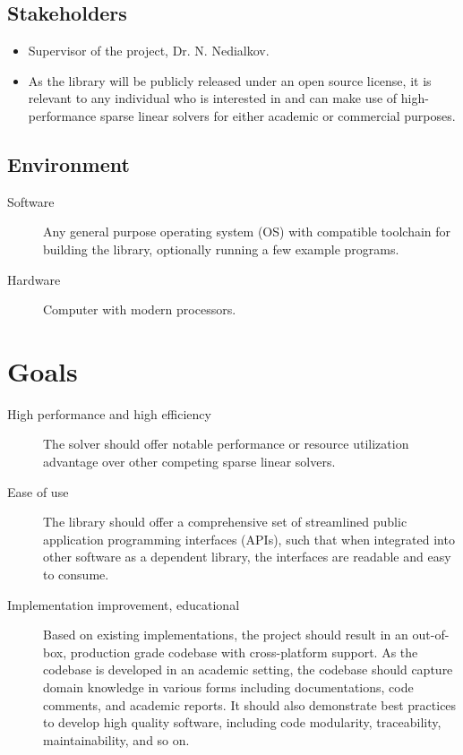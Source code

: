 \documentclass{article}
\begin{document}
\subsection{Stakeholders}

\begin{itemize}
\item Supervisor of the project, Dr. N. Nedialkov.
\item As the library will be publicly released under an open source license, it is
  relevant to any individual who is interested in and can make use of
  high-performance sparse linear solvers for either academic or commercial
  purposes.
\end{itemize}

\subsection{Environment}


\begin{description}
\item[Software] Any general purpose operating system (OS) with compatible toolchain
  for building the library, optionally running a few example programs.
\item[Hardware] Computer with modern processors.
\end{description}

\section{Goals}

\begin{description}
\item[High performance and high efficiency] The solver should offer notable
  performance or resource utilization advantage over other competing sparse
  linear solvers.
\item[Ease of use] The library should offer a comprehensive set of streamlined
  public application programming interfaces (APIs), such that when integrated
  into other software as a dependent library, the interfaces are readable and
  easy to consume.
\item[Implementation improvement, educational] Based on existing implementations,
  the project should result in an out-of-box, production grade codebase with
  cross-platform support. As the codebase is developed in an academic setting,
  the codebase should capture domain knowledge in various forms including
  documentations, code comments, and academic reports. It should also
  demonstrate best practices to develop high quality software, including code
  modularity, traceability, maintainability, and so on.
\end{description}
\end{document}
